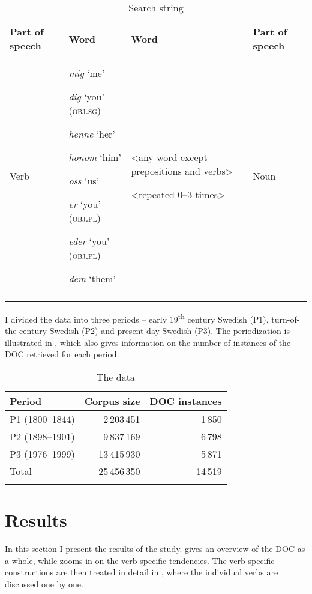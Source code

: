 \documentclass[output=paper]{langscibook}
\begin{document}
\begin{table}
\begin{tabularx}{\textwidth}{lQQl}
\lsptoprule
Part of speech & Word & Word & Part of speech\\
\midrule
Verb & \textit{mig} ‘me’

\textit{dig} ‘you’ (\textsc{obj}.\textsc{sg})

\textit{henne} ‘her’

\textit{honom} ‘him’

\textit{oss} ‘us’

\textit{er} ‘you’ (\textsc{obj}.\textsc{pl})

\textit{eder} ‘you’ (\textsc{obj}.\textsc{pl})

\textit{dem} ‘them’ & <any word except prepositions and verbs>

<repeated 0–3 times> & Noun\\
\lspbottomrule
\end{tabularx}
\caption{Search string}
\label{fig:valdeson:2}
\end{table}


I divided the data into three periods – early 19\textsuperscript{th} century Swedish (P1), turn-of-the-century Swedish (P2) and present-day Swedish (P3). The periodization is illustrated in , which also gives information on the number of instances of the DOC retrieved for each period.


\begin{table}
\caption{The data}
\label{tab:valdeson:3}
\begin{tabular}{lrr}
\lsptoprule
Period & Corpus size & DOC instances\\
\midrule
P1 (1800–1844) & 2\,203\,451 & 1\,850\\
P2 (1898–1901) & 9\,837\,169 & 6\,798\\
P3 (1976–1999) & 13\,415\,930 & 5\,871\\
\midrule
Total & 25\,456\,350 & 14\,519\\
\lspbottomrule
\end{tabular}
\end{table}

\section{Results}\label{sec:valdeson:5}


In this section I present the results of the study.  gives an overview of the DOC as a whole, while  zooms in on the verb-specific tendencies. The verb-specific constructions are then treated in detail in , where the individual verbs are discussed one by one.
\end{document}
